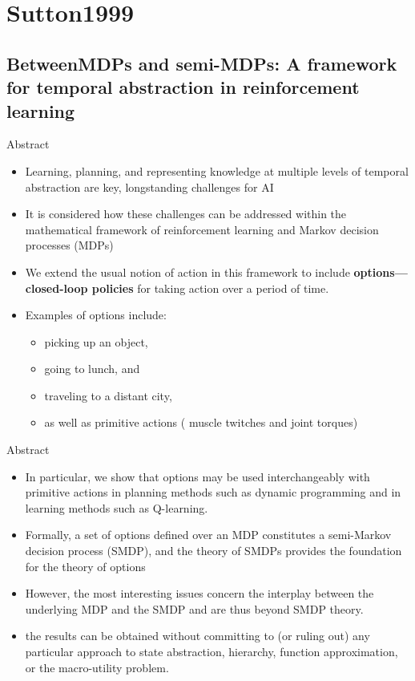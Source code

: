 
\section{Sutton1999}

\subsection{BetweenMDPs and semi-MDPs: A framework for temporal abstraction in reinforcement learning}
\begin{frame}{Abstract}{}
  \begin{itemize}
    \item Learning, planning, and representing knowledge at multiple levels of temporal abstraction are key, longstanding challenges for AI
    \item It is considered how these challenges can be addressed within the mathematical framework of reinforcement learning and Markov decision processes (MDPs)
    \item We extend the usual notion of action in this framework to include \textbf{options—closed-loop policies} for taking action over a period of time.
    \item Examples of options include:
    
    \begin{itemize}
        \item picking up an object,
        \item going to lunch, and
        \item traveling to a distant city,
        \item as well as primitive actions ( muscle twitches and joint torques)
    \end{itemize}
    
  \end{itemize}
\end{frame}

\begin{frame}{Abstract}
    \begin{itemize}
        \item In particular, we show that options may be used interchangeably with primitive actions in planning methods such as dynamic programming and in learning methods such as Q-learning.
        \item Formally, a set of options defined over an MDP constitutes a semi-Markov decision process (SMDP), and the theory of SMDPs provides the foundation for the theory of options
        \item However, the most interesting issues concern the interplay between the underlying MDP and the SMDP and are thus beyond SMDP theory.
        \item the results can be obtained without committing to (or ruling out) any particular approach to state abstraction, hierarchy, function approximation, or the macro-utility problem.
    \end{itemize}
\end{frame}

